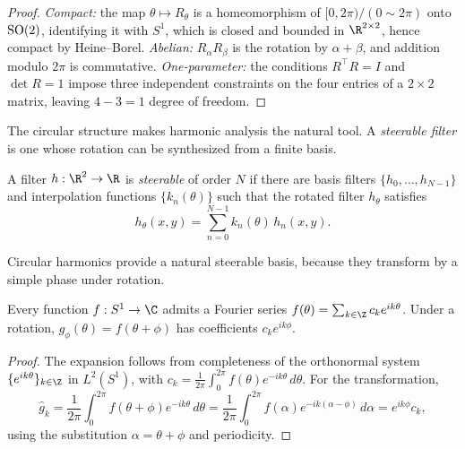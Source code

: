 \begin{proof}
\emph{Compact:} the map $\theta \mapsto R_\theta$ is a homeomorphism of
$[0,2\pi)/(0 \sim 2\pi)$ onto $\operatorname{SO}(2)$, identifying it with $S^1$, which is
closed and bounded in $\R^{2 \times 2}$, hence compact by Heine--Borel.
\emph{Abelian:} $R_\alpha R_\beta$ is the rotation by $\alpha + \beta$, and
addition modulo $2\pi$ is commutative. \emph{One-parameter:} the conditions
$R^\top R = I$ and $\det R = 1$ impose three independent constraints on the four
entries of a $2 \times 2$ matrix, leaving $4 - 3 = 1$ degree of freedom.
\end{proof}

The circular structure makes harmonic analysis the natural tool. A
\emph{steerable filter} is one whose rotation can be synthesized from a finite
basis.

\begin{definition}
\label{def:groups:steerable-filter}
A filter $h: \R^2 \to \R$ is \emph{steerable} of order $N$ if there are basis
filters $\{h_0, \dots, h_{N-1}\}$ and interpolation functions $\{k_n(\theta)\}$
such that the rotated filter $h_\theta$ satisfies
\begin{equation}
  h_\theta(x,y) = \sum_{n=0}^{N-1} k_n(\theta)\, h_n(x,y).
\end{equation}
\end{definition}

Circular harmonics provide a natural steerable basis, because they transform by a
simple phase under rotation.

\begin{theorem}
\label{thm:groups:circular-harmonics}
Every function $f: S^1 \to \C$ admits a Fourier series $f(\theta) = \sum_{k \in
\Z} c_k e^{ik\theta}$. Under a rotation, $g_\phi(\theta) = f(\theta + \phi)$ has
coefficients $c_k e^{ik\phi}$.
\end{theorem}

\begin{proof}
The expansion follows from completeness of the orthonormal system
$\{e^{ik\theta}\}_{k \in \Z}$ in $L^2(S^1)$, with $c_k = \frac{1}{2\pi}
\int_0^{2\pi} f(\theta) e^{-ik\theta}\,d\theta$. For the transformation,
\[
  \hat g_k = \frac{1}{2\pi}\int_0^{2\pi} f(\theta + \phi) e^{-ik\theta}\,d\theta
  = \frac{1}{2\pi}\int_0^{2\pi} f(\alpha) e^{-ik(\alpha - \phi)}\,d\alpha
  = e^{ik\phi} c_k,
\]
using the substitution $\alpha = \theta + \phi$ and periodicity.
\end{proof}

